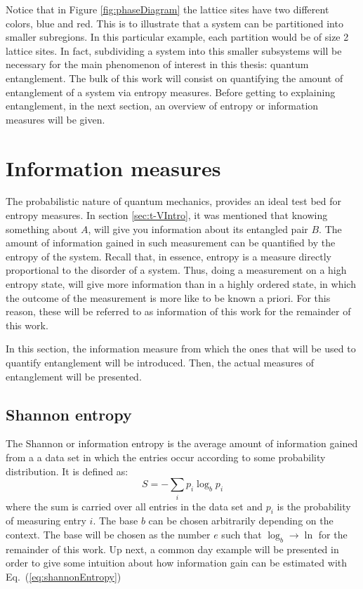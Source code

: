 Notice that in Figure \ref{fig:phaseDiagram} the lattice sites have two different colors, blue and red. This is to illustrate that a system can be partitioned into smaller subregions. In this particular example, each partition would be of size 2 lattice sites. In fact, subdividing a system into this smaller subsystems will be necessary for the main phenomenon of interest in this thesis: quantum entanglement. The bulk of this work will consist on quantifying the amount of entanglement of a system via entropy measures. Before getting to explaining entanglement, in the next section, an overview of entropy or information measures will be given.

\section{Information measures}
\label{sec:informationMeasures}

	The probabilistic nature of quantum mechanics, provides an ideal test bed for entropy measures. In section \ref{sec:t-VIntro}, it was mentioned that knowing something about $A$, will give you information about its entangled pair $B$. The amount of information gained in such measurement can be quantified by the entropy of the system. Recall that, in essence, entropy is a measure directly proportional to the disorder of a system. Thus, doing a measurement on a high entropy state, will give more information than in a highly ordered state, in which the outcome of the measurement is more like to be known a priori. For this reason, these will be referred to as information of this work for the remainder of this work.
	
	In this section, the information measure from which the ones that will be used to quantify entanglement will be introduced. Then, the actual measures of entanglement will be presented.
	
	\subsection{Shannon entropy}
	
	The Shannon or information entropy is the average amount of information gained from a a data set in which the entries occur according to some probability distribution. It is defined as:
	\begin{equation}
	S = -\sum_{i} p_i \log_{b} p_i
	\label{eq:shannonEntropy}
	\end{equation}
	where the sum is carried over all entries in the data set and $p_i$ is the probability of measuring entry $i$. The base $b$ can be chosen arbitrarily depending on the context. The base will be chosen as the number $e$ such that $\log_b \to \ln$ for the remainder of this work. Up next, a common day example will be presented in order to give some intuition about how information gain can be estimated with Eq.~(\ref{eq:shannonEntropy})
	
